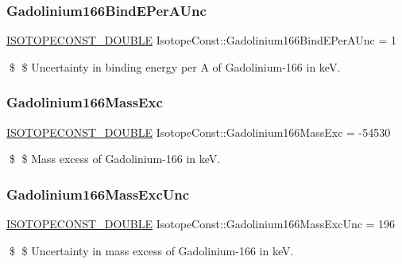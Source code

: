 \subsubsection{\texorpdfstring{Gadolinium166\+Bind\+E\+Per\+A\+Unc}{Gadolinium166BindEPerAUnc}}
{\footnotesize\ttfamily \mbox{\hyperlink{group___isotope_const-_macros_ga8f45a7272ce02c0b4c65c44636ed719a}{I\+S\+O\+T\+O\+P\+E\+C\+O\+N\+S\+T\+\_\+\+D\+O\+U\+B\+LE}} Isotope\+Const\+::\+Gadolinium166\+Bind\+E\+Per\+A\+Unc = 1}

\$ \$ Uncertainty in binding energy per A of Gadolinium-\/166 in keV. \mbox{\label{group___isotope_const-_gadolinium-_gd166_gaa190790c9fa20056922c0daf2d86737a}} 
\subsubsection{\texorpdfstring{Gadolinium166\+Mass\+Exc}{Gadolinium166MassExc}}
{\footnotesize\ttfamily \mbox{\hyperlink{group___isotope_const-_macros_ga8f45a7272ce02c0b4c65c44636ed719a}{I\+S\+O\+T\+O\+P\+E\+C\+O\+N\+S\+T\+\_\+\+D\+O\+U\+B\+LE}} Isotope\+Const\+::\+Gadolinium166\+Mass\+Exc = -\/54530}

\$ \$ Mass excess of Gadolinium-\/166 in keV. \mbox{\label{group___isotope_const-_gadolinium-_gd166_gadb0cc5e63c6675525f3de24871acb813}} 
\subsubsection{\texorpdfstring{Gadolinium166\+Mass\+Exc\+Unc}{Gadolinium166MassExcUnc}}
{\footnotesize\ttfamily \mbox{\hyperlink{group___isotope_const-_macros_ga8f45a7272ce02c0b4c65c44636ed719a}{I\+S\+O\+T\+O\+P\+E\+C\+O\+N\+S\+T\+\_\+\+D\+O\+U\+B\+LE}} Isotope\+Const\+::\+Gadolinium166\+Mass\+Exc\+Unc = 196}

\$ \$ Uncertainty in mass excess of Gadolinium-\/166 in keV. \mbox{\label{group___isotope_const-_gadolinium-_gd166_ga506637dbdb8b3689e91506312938bb60}} 
